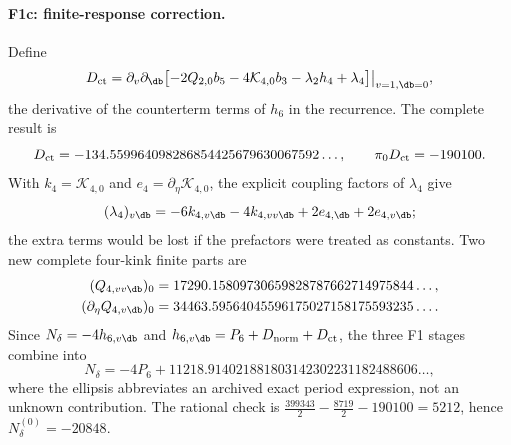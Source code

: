 \paragraph{F1c: finite-response correction.} Define
\begin{equation}
 D_{\rm ct}=\partial_v\partial_{\db}\bigl[-2Q_{2,0}b_5-4\mathcal K_{4,0}b_3-\lambda_2h_4+\lambda_4\bigr]\big|_{v=1,\db=0},
\end{equation}
the derivative of the counterterm terms of $h_6$ in the recurrence. The complete result is
\begin{equation}
 D_{\rm ct}=-134.559964098286854425679630067592\ldots,\qquad \pi_0D_{\rm ct}=-190100.
\end{equation}
With $k_4=\mathcal K_{4,0}$ and $e_4=\partial_\eta\mathcal K_{4,0}$, the explicit coupling factors of $\lambda_4$ give
\begin{equation}
 (\lambda_4)_{v\db}=-6k_{4,v\db}-4k_{4,vv\db}+2e_{4,\db}+2e_{4,v\db};
\end{equation}
the extra terms would be lost if the prefactors were treated as constants. Two new complete four-kink finite parts are
\begin{equation}
\begin{aligned}
 (Q_{4,vv\db})_0&=17290.15809730659828787662714975844\ldots,\\
 (\partial_\eta Q_{4,v\db})_0&=34463.59564045596175027158175593235\ldots .
\end{aligned}
\end{equation}
Since $N_\delta=-4h_{6,v\db}$ and $h_{6,v\db}=P_6+D_{\rm norm}+D_{\rm ct}$, the three F1 stages combine into
\begin{equation}
 N_\delta=-4P_6+11218.914021881803142302231182488606\ldots ,
 \label{sri:eq:dualC:NdP6}
\end{equation}
where the ellipsis abbreviates an archived exact period expression, not an unknown contribution. The rational check is
$\frac{399343}{2}-\frac{8719}{2}-190100=5212$, hence $N_\delta^{(0)}=-20848$.

